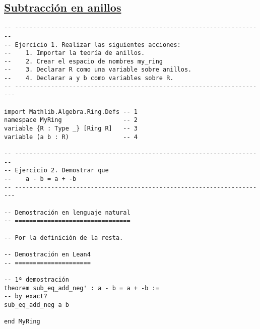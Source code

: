 \subsection{\href{./src/Basicos/Subtraccion\_en\_anillos.lean}{Subtracción en anillos}}
\label{sec:org137a28b}
\begin{verbatim}
-- ---------------------------------------------------------------------
-- Ejercicio 1. Realizar las siguientes acciones:
--    1. Importar la teoría de anillos.
--    2. Crear el espacio de nombres my_ring
--    3. Declarar R como una variable sobre anillos.
--    4. Declarar a y b como variables sobre R.
-- ----------------------------------------------------------------------

import Mathlib.Algebra.Ring.Defs -- 1
namespace MyRing                 -- 2
variable {R : Type _} [Ring R]   -- 3
variable (a b : R)               -- 4

-- ---------------------------------------------------------------------
-- Ejercicio 2. Demostrar que
--    a - b = a + -b
-- ----------------------------------------------------------------------

-- Demostración en lenguaje natural
-- ================================

-- Por la definición de la resta.

-- Demostración en Lean4
-- =====================

-- 1ª demostración
theorem sub_eq_add_neg' : a - b = a + -b :=
-- by exact?
sub_eq_add_neg a b

end MyRing
\end{verbatim}

